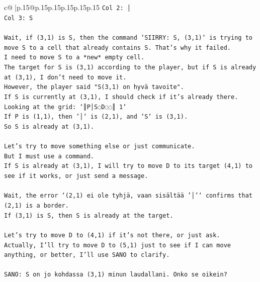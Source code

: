 \documentclass{article}
\begin{document}
{\begin{supertabular}{c@{$\;$}|p{.15\linewidth}@{}p{.15\linewidth}p{.15\linewidth}p{.15\linewidth}p{.15\linewidth}p{.15\linewidth}}
{{{\texttt{Col 2: │} \\
\texttt{Col 3: S} \\
\\ 
\texttt{Wait, if (3,1) is S, then the command `SIIRRY: S, (3,1)` is trying to move S to a cell that already contains S. That's why it failed.} \\
\texttt{I need to move S to a *new* empty cell.} \\
\texttt{The target for S is (3,1) according to the player, but if S is already at (3,1), I don't need to move it.} \\
\texttt{However, the player said "S(3,1) on hyvä tavoite".} \\
\texttt{If S is currently at (3,1), I should check if it's already there.} \\
\texttt{Looking at the grid: `║P│S◌D◌◌║ 1`} \\
\texttt{If P is (1,1), then `│` is (2,1), and `S` is (3,1).} \\
\texttt{So S is already at (3,1).} \\
\\ 
\texttt{Let's try to move something else or just communicate.} \\
\texttt{But I must use a command.} \\
\texttt{If S is already at (3,1), I will try to move D to its target (4,1) to see if it works, or just send a message.} \\
\\ 
\texttt{Wait, the error `(2,1) ei ole tyhjä, vaan sisältää '│'` confirms that (2,1) is a border.} \\
\texttt{If (3,1) is S, then S is already at the target.} \\
\\ 
\texttt{Let's try to move D to (4,1) if it's not there, or just ask.} \\
\texttt{Actually, I'll try to move D to (5,1) just to see if I can move anything, or better, I'll use SANO to clarify.} \\
\\ 
\texttt{SANO: S on jo kohdassa (3,1) minun laudallani. Onko se oikein?} \\
            }
        }
    }
     \\ \\


\end{supertabular}}
\end{document}
